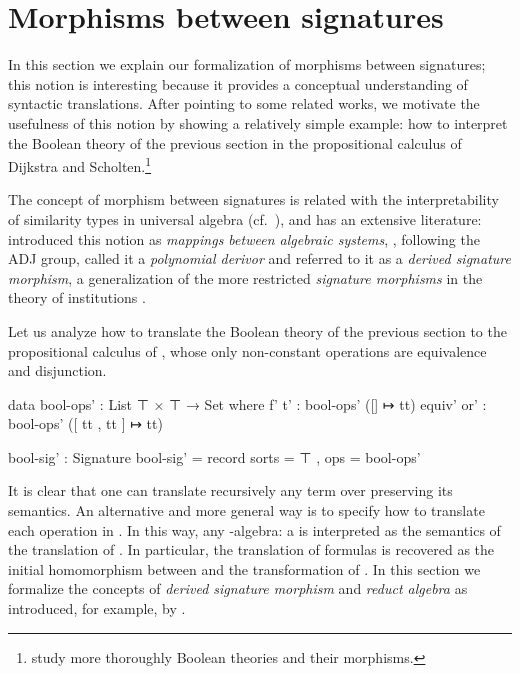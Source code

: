 \section{Morphisms between signatures}
\label{sec:trans}
In this section we explain our formalization of morphisms between
signatures; this notion is interesting because it provides a
conceptual understanding of syntactic translations. After pointing to
some related works, we motivate the usefulness of this notion by
showing a relatively simple example: how to interpret the Boolean
theory of the previous section in the propositional calculus of
Dijkstra and Scholten.\footnote{\cite{rocha-2007}
  study more thoroughly Boolean theories and their morphisms.}

The concept of morphism between signatures is related with the
interpretability of similarity types in universal algebra
(cf.~\cite{garcia-84}), and has an extensive literature:
~\cite{fujiwara-1959} introduced this notion as
\textit{mappings between algebraic systems},
\cite{janssen-98}, following the ADJ group, called it a
\textit{polynomial derivor} and \cite{mossakowski-15}
referred to it as a \textit{derived signature morphism}, a generalization
of the more restricted \textit{signature morphisms} in the theory of
institutions \citep{goguen-92}.

Let us analyze how to translate the Boolean theory of the previous
section to the propositional calculus of \cite{dijkstra-scholten},
whose only non-constant operations are equivalence and disjunction.
\begin{spec}
data bool-ops' : List ⊤ × ⊤ → Set where
  f' t'    : bool-ops' ([] ↦ tt)
  equiv' or' : bool-ops' ([ tt , tt ] ↦ tt)

bool-sig' : Signature
bool-sig' = record { sorts = ⊤ , ops = bool-ops' }
\end{spec}
It is clear that one can translate recursively any term over
 preserving its
semantics. %
An alternative and more general way is to specify how to translate
each operation in . In this way,
any -algebra: a
 is interpreted as the semantics of the
translation of . In particular, the translation of formulas is
recovered as the initial homomorphism between  and the
transformation of . In this section we formalize the
concepts of \emph{derived signature morphism} and \emph{reduct
  algebra} as introduced, for example, by \cite{sannella2012foundations}.

